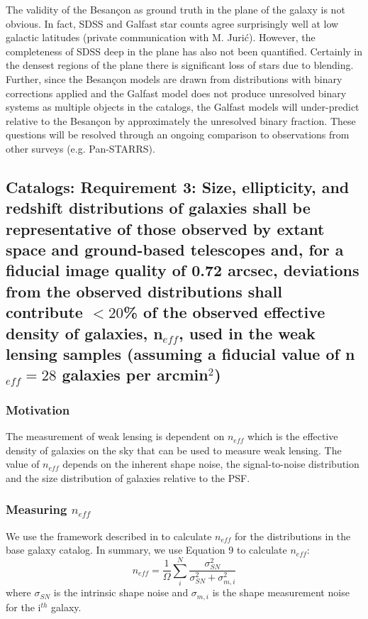 \documentclass[]{article}
\begin{document}
{The validity of the Besan\c{c}on as ground truth in the plane of the galaxy is not obvious.  In fact, SDSS and Galfast star counts agree surprisingly well at low galactic latitudes (private communication with M. Juri\'{c}). 
However, the completeness of SDSS deep in the plane has also not been quantified.  Certainly in the densest regions
of the plane there is significant loss of stars due to blending.  Further, since the Besan\c{c}on models are drawn
from distributions with binary corrections applied and the Galfast model does not produce unresolved binary systems
as multiple objects in the catalogs, the Galfast models will under-predict relative to the Besan\c{c}on by 
approximately the unresolved binary fraction.  These questions will be resolved through an ongoing comparison to observations
from other surveys (e.g. Pan-STARRS).

\subsection{Catalogs:  Requirement 3: Size, ellipticity, and redshift
  distributions of galaxies shall be representative of those observed
  by extant space and ground-based telescopes and, for a fiducial
  image quality of 0.72 arcsec, deviations from the observed
  distributions shall contribute $<20$\% of the observed effective
  density of galaxies, n$_{eff}$, used in the weak lensing samples
  (assuming a fiducial value of n$_{eff} = 28$ galaxies per
  arcmin$^2$)}
\subsubsection{Motivation}
The measurement of weak lensing is dependent 
on $n_{eff}$ which is the effective density of galaxies on the sky that can be used to measure weak lensing.  
The value of $n_{eff}$ depends on the inherent shape noise, the signal-to-noise distribution and the size distribution of galaxies relative to the PSF.



\subsubsection{Measuring $n_{eff}$}
We use the framework described in \citet{chang} to calculate $n_{eff}$ for the distributions in the 
base galaxy catalog.  In summary, we use Equation 9 to calculate $n_{eff}$:
\begin{equation}
n_{eff} = \frac{1}{\Omega}\sum^N_i\frac{\sigma^2_{SN}}{\sigma^2_{SN}+\sigma^2_{m,i}}
\end{equation}
where $\sigma_{SN}$ is the intrinsic shape noise and $\sigma_{m,i}$ is the shape measurement noise for the i$^{th}$ galaxy.

}
\end{document}
